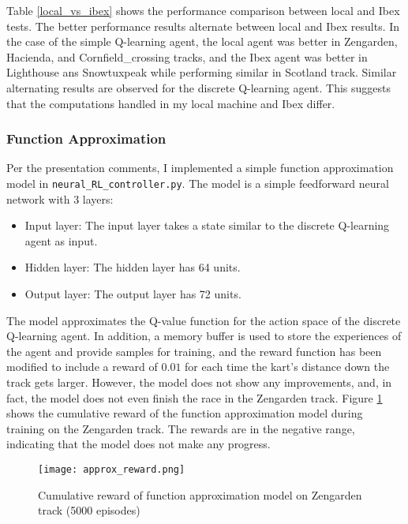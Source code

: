 \documentclass{article}
\begin{document}
Table \ref{local_vs_ibex} shows the performance comparison between local and Ibex tests. The better performance results alternate between local and Ibex results. In the case of the simple Q-learning agent, the local agent was better in Zengarden, Hacienda, and Cornfield\_crossing tracks, and the Ibex agent was better in Lighthouse ans Snowtuxpeak while performing similar in Scotland track. Similar alternating results are observed for the discrete Q-learning agent. This suggests that the computations handled in my local machine and Ibex differ. 

\subsubsection{Function Approximation}

Per the presentation comments, I implemented a simple function approximation model in \texttt{neural\_RL\_controller.py}. The model is a simple feedforward neural network with 3 layers:

\begin{itemize}
    \item Input layer: The input layer takes a state similar to the discrete Q-learning agent as input.
    \item Hidden layer: The hidden layer has 64 units.
    \item Output layer: The output layer has 72 units.
\end{itemize}

The model approximates the Q-value function for the action space of the discrete Q-learning agent. In addition, a memory buffer is used to store the experiences of the agent and provide samples for training, and the reward function has been modified to include a reward of $0.01$ for each time the kart's distance down the track gets larger. However, the model does not show any improvements, and, in fact, the model does not even finish the race in the Zengarden track. Figure \ref{approx_reward} shows the cumulative reward of the function approximation model during training on the Zengarden track. The rewards are in the negative range, indicating that the model does not make any progress.

\begin{figure}[h]
    \centering
    \texttt{[image: approx\_reward.png]}
    \caption{Cumulative reward of function approximation model on Zengarden track (5000 episodes)}
    \label{approx_reward}
\end{figure}
\end{document}
